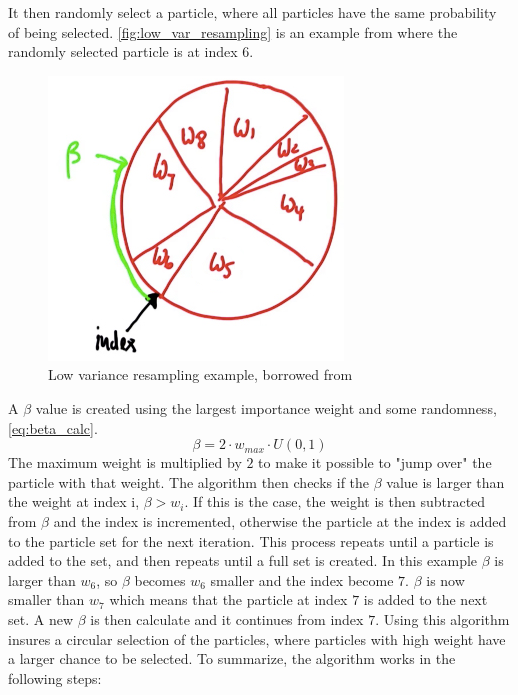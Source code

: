 \documentclass[Main]{subfiles}
\begin{document}
It then randomly select a particle, where all particles have the same probability of being selected.
\autoref{fig:low_var_resampling} is an example from \citep{Thrun2002} where the randomly selected particle is at index 6.
\begin{figure}[H]
	\centering
	\includegraphics[width=0.3\linewidth]{./Figures/low_var_resampling.png}
	\caption{Low variance resampling example, borrowed from \citep{Thrun2015}}
	\label{fig:low_var_resampling}
\end{figure}\noindent
A $\beta$ value is created using the largest importance weight and some randomness, \autoref{eq:beta_calc}.
\begin{equation}
\label{eq:beta_calc}
	\beta = 2 \cdot w_{max} \cdot U(0,1)
\end{equation}
The maximum weight is multiplied by $2$ to make it possible to "jump over" the particle with that weight.
The algorithm then checks if the $\beta$ value is larger than the weight at index i, $\beta > w_i$.
If this is the case, the weight is then subtracted from $\beta$ and the index is incremented, otherwise the particle at the index is added to the particle set for the next iteration. 
This process repeats until a particle is added to the set, and then repeats until a full set is created.
In this example $\beta$ is larger than $w_6$, so $\beta$ becomes $w_6$ smaller and the index become $7$.
$\beta$ is now smaller than $w_7$ which means that the particle at index $7$ is added to the next set. 
A new $\beta$ is then calculate and it continues from index $7$.
Using this algorithm insures a circular selection of the particles, where particles with high weight have a larger chance to be selected.
To summarize, the algorithm works in the following steps:
\end{document}
